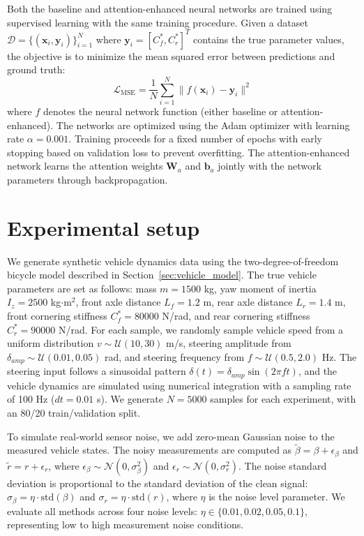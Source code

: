 \documentclass[Afour,sageh,times]{sagej}
\begin{document}
Both the baseline and attention-enhanced neural networks are trained using supervised learning with the same training procedure. Given a dataset $\mathcal{D} = \{(\mathbf{x}_i, \mathbf{y}_i)\}_{i=1}^N$ where $\mathbf{y}_i = [C_f^*, C_r^*]^T$ contains the true parameter values, the objective is to minimize the mean squared error between predictions and ground truth:
\begin{equation}
\mathcal{L}_{\text{MSE}} = \frac{1}{N} \sum_{i=1}^N \|f(\mathbf{x}_i) - \mathbf{y}_i\|^2
\end{equation}
where $f$ denotes the neural network function (either baseline or attention-enhanced). The networks are optimized using the Adam optimizer with learning rate $\alpha = 0.001$. Training proceeds for a fixed number of epochs with early stopping based on validation loss to prevent overfitting. The attention-enhanced network learns the attention weights $\mathbf{W}_a$ and $\mathbf{b}_a$ jointly with the network parameters through backpropagation.

\section{Experimental setup}
\label{sec:experimental}

We generate synthetic vehicle dynamics data using the two-degree-of-freedom bicycle model described in Section~\ref{sec:vehicle_model}. The true vehicle parameters are set as follows: mass $m = 1500$ kg, yaw moment of inertia $I_z = 2500$ kg$\cdot$m$^2$, front axle distance $L_f = 1.2$ m, rear axle distance $L_r = 1.4$ m, front cornering stiffness $C_f^* = 80000$ N/rad, and rear cornering stiffness $C_r^* = 90000$ N/rad. For each sample, we randomly sample vehicle speed from a uniform distribution $v \sim \mathcal{U}(10, 30)$ m/s, steering amplitude from $\delta_{amp} \sim \mathcal{U}(0.01, 0.05)$ rad, and steering frequency from $f \sim \mathcal{U}(0.5, 2.0)$ Hz. The steering input follows a sinusoidal pattern $\delta(t) = \delta_{amp} \sin(2\pi f t)$, and the vehicle dynamics are simulated using numerical integration with a sampling rate of 100 Hz ($dt = 0.01$ s). We generate $N = 5000$ samples for each experiment, with an 80/20 train/validation split.

To simulate real-world sensor noise, we add zero-mean Gaussian noise to the measured vehicle states. The noisy measurements are computed as $\tilde{\beta} = \beta + \epsilon_\beta$ and $\tilde{r} = r + \epsilon_r$, where $\epsilon_\beta \sim \mathcal{N}(0, \sigma_\beta^2)$ and $\epsilon_r \sim \mathcal{N}(0, \sigma_r^2)$. The noise standard deviation is proportional to the standard deviation of the clean signal: $\sigma_\beta = \eta \cdot \text{std}(\beta)$ and $\sigma_r = \eta \cdot \text{std}(r)$, where $\eta$ is the noise level parameter. We evaluate all methods across four noise levels: $\eta \in \{0.01, 0.02, 0.05, 0.1\}$, representing low to high measurement noise conditions.
\end{document}
